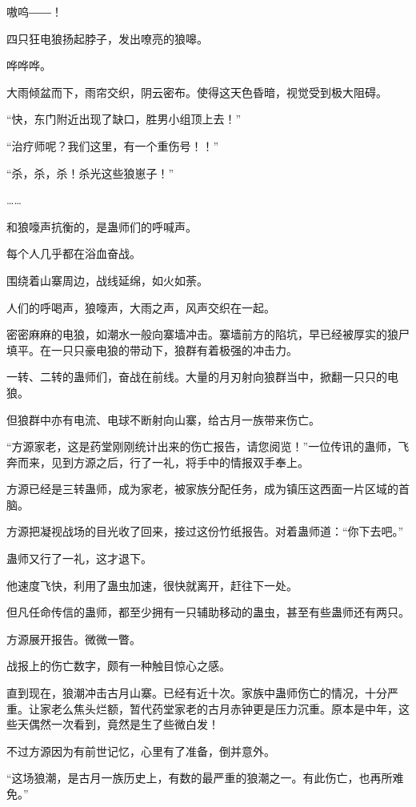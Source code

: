 
\begin{this_body}

嗷呜――！

四只狂电狼扬起脖子，发出嘹亮的狼嗥。

哗哗哗。

大雨倾盆而下，雨帘交织，阴云密布。使得这天色昏暗，视觉受到极大阻碍。

“快，东门附近出现了缺口，胜男小组顶上去！”

“治疗师呢？我们这里，有一个重伤号！！”

“杀，杀，杀！杀光这些狼崽子！”

……

和狼嚎声抗衡的，是蛊师们的呼喊声。

每个人几乎都在浴血奋战。

围绕着山寨周边，战线延绵，如火如荼。

人们的呼喝声，狼嚎声，大雨之声，风声交织在一起。

密密麻麻的电狼，如潮水一般向寨墙冲击。寨墙前方的陷坑，早已经被厚实的狼尸填平。在一只只豪电狼的带动下，狼群有着极强的冲击力。

一转、二转的蛊师们，奋战在前线。大量的月刃射向狼群当中，掀翻一只只的电狼。

但狼群中亦有电流、电球不断射向山寨，给古月一族带来伤亡。

“方源家老，这是药堂刚刚统计出来的伤亡报告，请您阅览！”一位传讯的蛊师，飞奔而来，见到方源之后，行了一礼，将手中的情报双手奉上。

方源已经是三转蛊师，成为家老，被家族分配任务，成为镇压这西面一片区域的首脑。

方源把凝视战场的目光收了回来，接过这份竹纸报告。对着蛊师道：“你下去吧。”

蛊师又行了一礼，这才退下。

他速度飞快，利用了蛊虫加速，很快就离开，赶往下一处。

但凡任命传信的蛊师，都至少拥有一只辅助移动的蛊虫，甚至有些蛊师还有两只。

方源展开报告。微微一瞥。

战报上的伤亡数字，颇有一种触目惊心之感。

直到现在，狼潮冲击古月山寨。已经有近十次。家族中蛊师伤亡的情况，十分严重。让家老么焦头烂额，暂代药堂家老的古月赤钟更是压力沉重。原本是中年，这些天偶然一次看到，竟然是生了些微白发！

不过方源因为有前世记忆，心里有了准备，倒并意外。

“这场狼潮，是古月一族历史上，有数的最严重的狼潮之一。有此伤亡，也再所难免。”


\end{this_body}
